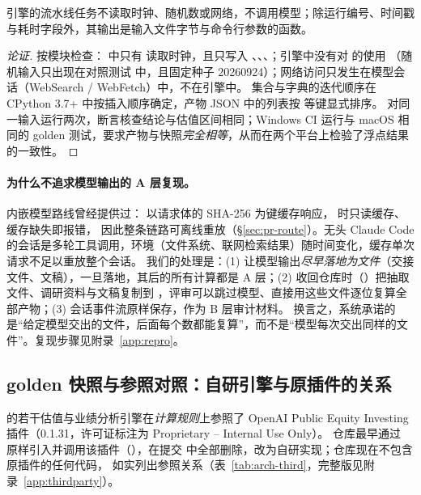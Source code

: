 \begin{proposition}[引擎确定性]\label{prop:arch-det}
引擎的流水线任务不读取时钟、随机数或网络，不调用模型；除运行编号、时间戳与耗时字段外，其输出是输入文件字节与命令行参数的函数。
\end{proposition}
\begin{proof}[论证]
按模块检查： 中只有  读取时钟，且只写入 、、、；引擎中没有对  的使用
（随机输入只出现在对照测试  中，且固定种子 20260924）；网络访问只发生在模型会话（WebSearch / WebFetch）中，不在引擎中。
集合与字典的迭代顺序在 CPython 3.7+ 中按插入顺序确定，产物 JSON 中的列表按  等键显式排序。
 对同一输入运行两次，断言核查结论与估值区间相同；Windows CI 运行与 macOS 相同的 golden 测试，要求产物与快照\emph{完全相等}，从而在两个平台上检验了浮点结果的一致性。
\end{proof}

\paragraph{为什么不追求模型输出的 A 层复现。}内嵌模型路线曾经提供过： 以请求体的 SHA-256 为键缓存响应， 时只读缓存、缓存缺失即报错，
因此整条链路可离线重放（\S\ref{sec:pr-route}）。无头 Claude Code 的会话是多轮工具调用，环境（文件系统、联网检索结果）随时间变化，缓存单次请求不足以重放整个会话。
我们的处理是：(1) 让模型输出\emph{尽早落地为文件}（交接文件、文稿），一旦落地，其后的所有计算都是 A 层；(2) 收回仓库时（）把抽取文件、调研资料与文稿复制到
，评审可以跳过模型、直接用这些文件逐位复算全部产物；(3) 会话事件流原样保存，作为 B 层审计材料。
换言之，系统承诺的是“给定模型交出的文件，后面每个数都能复算”，而不是“模型每次交出同样的文件”。复现步骤见附录~\ref{app:repro}。

\subsection{golden 快照与参照对照：自研引擎与原插件的关系}
\label{sec:arch-golden}

\sysname{} 的若干估值与业绩分析引擎在\emph{计算规则}上参照了 OpenAI Public Equity Investing 插件（0.1.31，许可证标注为 Proprietary – Internal Use Only）。
仓库最早通过  原样引入并调用该插件（），在提交  中全部删除，改为自研实现；仓库现在不包含原插件的任何代码，
 如实列出参照关系（表~\ref{tab:arch-third}，完整版见附录~\ref{app:thirdparty}）。

